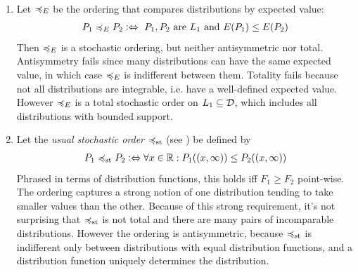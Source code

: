 \documentclass[a4paper]{scrreprt}
\begin{document}
    \begin{ex}~
        \begin{enumerate}
            \item 
            Let $\preccurlyeq_E$ be the ordering that compares distributions by expected value:
            \begin{gather*}
                P_1 \preccurlyeq_E P_2 \mathrel{\vcentcolon\Leftrightarrow} \text{ $P_1, P_2$ are $L_1$ and $E(P_1) \leq E(P_2)$} 
            \end{gather*}
            Then $\preccurlyeq_E$ is a stochastic ordering, but neither antisymmetric nor total. Antisymmetry fails since many distributions can have the same expected value, in which case $\preccurlyeq_E$ is indifferent between them. Totality fails because not all distributions are integrable, i.e. have a well-defined expected value. However $\preccurlyeq_E$ is a total stochastic order on $L_1 \subseteq \mathcal{D}$, which includes all distributions with bounded support.
            
            \item Let the \emph{usual stochastic order} $\preccurlyeq_{\text{st}}$ (see \cite{bib:shakedStochasticOrders}) be defined by 
            \begin{gather*}
                P_1 \preccurlyeq_{\text{st}} P_2 \mathrel{\vcentcolon\Leftrightarrow} \forall x \in \mathbb{R}: P_1((x, \infty)) \leq P_2((x, \infty))
            \end{gather*}
            Phrased in terms of distribution functions, this holds iff $F_1 \geq F_2$ point-wise. The ordering captures a strong notion of one distribution tending to take smaller values than the other. Because of this strong requirement, it's not surprising that $\preccurlyeq_{\text{st}}$ is not total and there are many pairs of incomparable distributions. However the ordering is antisymmetric, because $\preccurlyeq_{\text{st}}$ is indifferent only between distributions with equal distribution functions, and a distribution function uniquely determines the distribution.
        \end{enumerate}
    \end{ex}

    \let\dpref\dgeq
    \let\dnonpref\dleq
    \let\dstrpref\dgreater
    \let\dstrnonpref\dless
    
\end{document}
